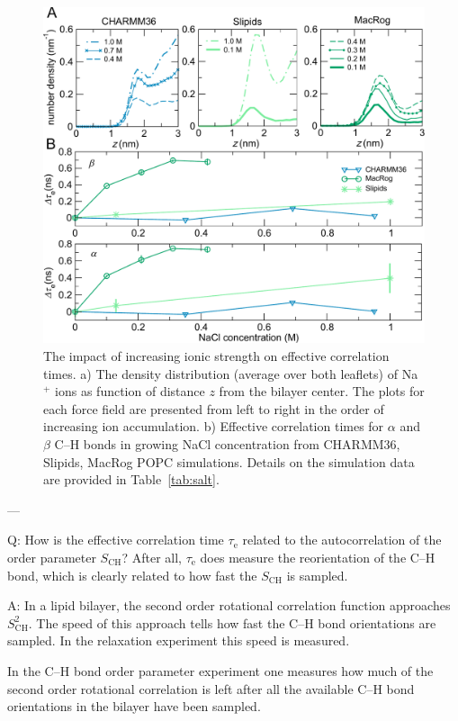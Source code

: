 \documentclass[journal=jpcbfk,manuscript=article,layout=twocolumn]{achemso}
\begin{document}
\begin{figure}[ht!]
\centering
\includegraphics[scale=0.36]{salt.pdf} 
\caption{The impact of increasing ionic strength on effective correlation times. a) The density distribution (average over both leaflets) of Na$^{+}$ ions as function of distance $z$ from the bilayer center. The plots for each force field are presented from left to right in the order of increasing ion accumulation. b) Effective correlation times for $\alpha$ and $\beta$ C--H bonds in growing NaCl concentration from CHARMM36, Slipids, MacRog POPC simulations. Details on the simulation data are provided in Table~\ref{tab:salt}.}
\label{fig:salt}
\end{figure}

---

Q: How is the effective correlation time $\tau_\mathrm e$ related to the autocorrelation of the order parameter $S_\mathrm{CH}$?
After all, $\tau_\mathrm e$ does measure the reorientation of the C--H bond, which is clearly related to how fast the $S_\mathrm{CH}$ is sampled.

A: In a lipid bilayer, the second order rotational correlation function approaches $S^2_\mathrm{CH}$. The speed of this approach tells how fast the C--H bond orientations are sampled. In the relaxation experiment this speed is measured.

In the C--H bond order parameter experiment one measures how much of the second order rotational correlation is left after all the available C--H bond orientations in the bilayer have been sampled.
\end{document}
